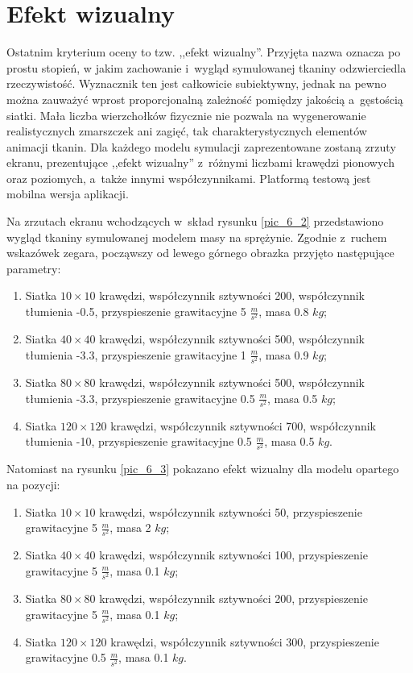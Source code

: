 		
	\section{Efekt wizualny}
	\label{t:wyniki:efektwiz}
		
		Ostatnim kryterium oceny to tzw. ,,efekt wizualny''. Przyjęta nazwa oznacza po prostu stopień, w jakim zachowanie i~wygląd symulowanej tkaniny odzwierciedla rzeczywistość. Wyznacznik ten jest całkowicie subiektywny, jednak na pewno można zauważyć wprost proporcjonalną zależność pomiędzy jakością a~gęstością siatki. Mała liczba wierzchołków fizycznie nie pozwala na wygenerowanie realistycznych zmarszczek ani zagięć, tak charakterystycznych elementów animacji tkanin. Dla każdego modelu symulacji zaprezentowane zostaną zrzuty ekranu, prezentujące ,,efekt wizualny'' z~różnymi liczbami krawędzi pionowych oraz poziomych, a~także innymi współczynnikami. Platformą testową jest mobilna wersja aplikacji.
		
		Na zrzutach ekranu wchodzących w~skład rysunku \ref{pic_6_2} przedstawiono wygląd tkaniny symulowanej modelem masy na sprężynie. Zgodnie z~ruchem wskazówek zegara, począwszy od lewego górnego obrazka przyjęto następujące parametry:
		
		\begin{enumerate}
			\item Siatka \(10 \times 10\) krawędzi, współczynnik sztywności 200, współczynnik tłumienia -0.5, przyspieszenie grawitacyjne 5 \( \frac{m}{s^2} \), masa 0.8 \(kg\);
			\item Siatka \(40 \times 40\) krawędzi, współczynnik sztywności 500, współczynnik tłumienia -3.3, przyspieszenie grawitacyjne 1 \( \frac{m}{s^2} \), masa 0.9 \(kg\);
			\item Siatka \(80 \times 80\) krawędzi, współczynnik sztywności 500, współczynnik tłumienia -3.3, przyspieszenie grawitacyjne 0.5 \( \frac{m}{s^2} \), masa 0.5 \(kg\);
			\item Siatka \(120 \times 120\) krawędzi, współczynnik sztywności 700, współczynnik tłumienia -10, przyspieszenie grawitacyjne 0.5 \( \frac{m}{s^2} \), masa 0.5 \(kg\).
		\end{enumerate}
		
		Natomiast na rysunku \ref{pic_6_3} pokazano efekt wizualny dla modelu opartego na pozycji:
		
		\begin{enumerate}
			\item Siatka \(10 \times 10\) krawędzi, współczynnik sztywności 50, przyspieszenie grawitacyjne 5 \( \frac{m}{s^2} \), masa 2 \(kg\);
			\item Siatka \(40 \times 40\) krawędzi, współczynnik sztywności 100, przyspieszenie grawitacyjne 5 \( \frac{m}{s^2} \), masa 0.1 \(kg\);
			\item Siatka \(80 \times 80\) krawędzi, współczynnik sztywności 200, przyspieszenie grawitacyjne 5 \( \frac{m}{s^2} \), masa 0.1 \(kg\);
			\item Siatka \(120 \times 120\) krawędzi, współczynnik sztywności 300, przyspieszenie grawitacyjne 0.5 \( \frac{m}{s^2} \), masa 0.1 \(kg\).
		\end{enumerate}
		
